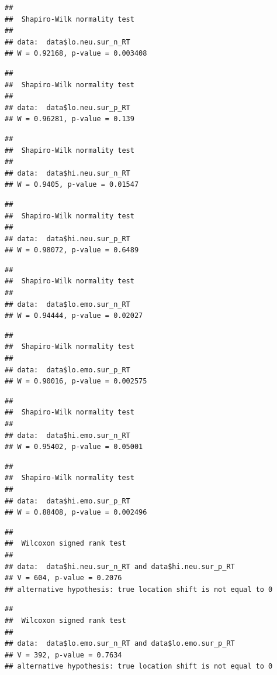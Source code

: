 \documentclass[man]{apa6}
\begin{document}
\begin{verbatim}
## 
##  Shapiro-Wilk normality test
## 
## data:  data$lo.neu.sur_n_RT
## W = 0.92168, p-value = 0.003408
\end{verbatim}

\begin{verbatim}
## 
##  Shapiro-Wilk normality test
## 
## data:  data$lo.neu.sur_p_RT
## W = 0.96281, p-value = 0.139
\end{verbatim}

\begin{verbatim}
## 
##  Shapiro-Wilk normality test
## 
## data:  data$hi.neu.sur_n_RT
## W = 0.9405, p-value = 0.01547
\end{verbatim}

\begin{verbatim}
## 
##  Shapiro-Wilk normality test
## 
## data:  data$hi.neu.sur_p_RT
## W = 0.98072, p-value = 0.6489
\end{verbatim}

\begin{verbatim}
## 
##  Shapiro-Wilk normality test
## 
## data:  data$lo.emo.sur_n_RT
## W = 0.94444, p-value = 0.02027
\end{verbatim}

\begin{verbatim}
## 
##  Shapiro-Wilk normality test
## 
## data:  data$lo.emo.sur_p_RT
## W = 0.90016, p-value = 0.002575
\end{verbatim}

\begin{verbatim}
## 
##  Shapiro-Wilk normality test
## 
## data:  data$hi.emo.sur_n_RT
## W = 0.95402, p-value = 0.05001
\end{verbatim}

\begin{verbatim}
## 
##  Shapiro-Wilk normality test
## 
## data:  data$hi.emo.sur_p_RT
## W = 0.88408, p-value = 0.002496
\end{verbatim}

\begin{verbatim}
## 
##  Wilcoxon signed rank test
## 
## data:  data$hi.neu.sur_n_RT and data$hi.neu.sur_p_RT
## V = 604, p-value = 0.2076
## alternative hypothesis: true location shift is not equal to 0
\end{verbatim}

\begin{verbatim}
## 
##  Wilcoxon signed rank test
## 
## data:  data$lo.emo.sur_n_RT and data$lo.emo.sur_p_RT
## V = 392, p-value = 0.7634
## alternative hypothesis: true location shift is not equal to 0
\end{verbatim}
\end{document}
